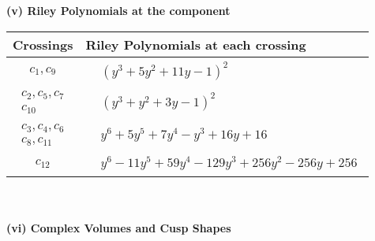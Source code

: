 \documentclass[1p]{elsarticle_modified}
\theoremstyle{definition}
\begin{document}
\newpage\renewcommand{\arraystretch}{1}
\flushleft \textbf{(v) Riley Polynomials at the component}\newline \\
\begin{tabular}{m{50pt}|m{274pt}}
Crossings & \hspace{64pt}Riley Polynomials at each crossing \\
\hline $$\begin{aligned}c_{1},c_{9}\end{aligned}$$&$\begin{aligned}
&(y^3+5 y^2+11 y-1)^2
\end{aligned}$\\
\hline $$\begin{aligned}c_{2},c_{5},c_{7}\\c_{10}\end{aligned}$$&$\begin{aligned}
&(y^3+y^2+3 y-1)^2
\end{aligned}$\\
\hline $$\begin{aligned}c_{3},c_{4},c_{6}\\c_{8},c_{11}\end{aligned}$$&$\begin{aligned}
&y^6+5 y^5+7 y^4- y^3+16 y+16
\end{aligned}$\\
\hline $$\begin{aligned}c_{12}\end{aligned}$$&$\begin{aligned}
&y^6-11 y^5+59 y^4-129 y^3+256 y^2-256 y+256
\end{aligned}$\\
\hline
\end{tabular}\\~\\
\newpage\flushleft \textbf{(vi) Complex Volumes and Cusp Shapes}
\end{document}
